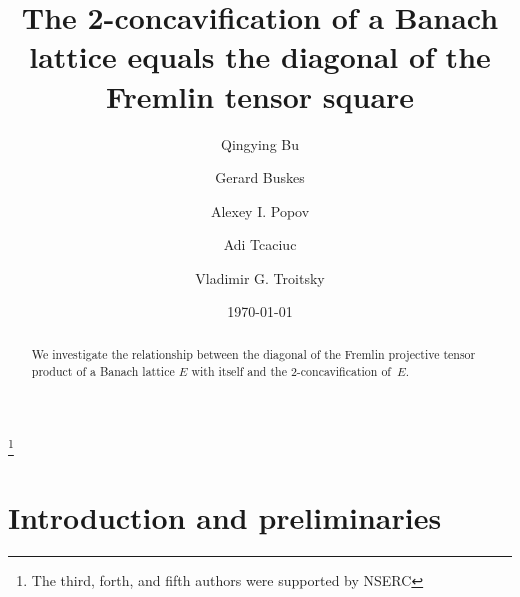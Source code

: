 \documentclass[12pt]{amsart}
\theoremstyle{plain}
\theoremstyle{definition}
\begin{document}
\baselineskip 18pt

\title[The 2-concavification is the diagonal of a tensor square]
      {The 2-concavification of a Banach lattice equals the diagonal 
          of the Fremlin tensor square}

\author[Q.~Bu]{Qingying Bu}
\author[G.~Buskes]{Gerard Buskes}
\author[A.~I.~Popov]{Alexey I. Popov}
\author[A.~Tcaciuc]{Adi Tcaciuc}
\author[V.~G.~Troitsky]{Vladimir G. Troitsky}

\address[Q.~Bu and G.~Buskes]
   {Department of Mathematics, University of Mississippi, University,
     MS 38677-1848. USA}

\address[A.~I.~Popov]
  {Department of Pure Mathematics, Faculty of Mathematics
   University of Waterloo, Waterloo, Ontario, N2L 3G1. Canada}

\address[A.~Tcaciuc]{Mathematics and Statistics Department,
   Grant MacEwan University, Edmonton, AB, T5J\,P2P, Canada}

\address[V.~G.~Troitsky]
  {Department of Mathematical
  and Statistical Sciences, University of Alberta, Edmonton,
  AB, T6G\,2G1. Canada}

\thanks{The third, forth, and fifth authors were supported by NSERC}

\begin{abstract}
  We investigate the relationship between the diagonal of the Fremlin
  projective tensor product of a Banach lattice $E$ with itself and the
  2-concavification of~$E$.
\end{abstract}

\date{\today}

\maketitle

\section{Introduction and preliminaries}
\end{document}
